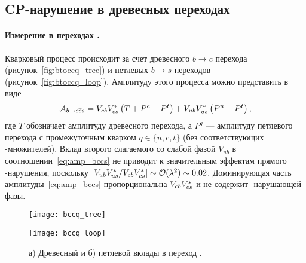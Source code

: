 \subsection{CP-нарушение в древесных переходах}\label{sec:cpv_tree}
\paragraph{\boldmath Измерение \sindbeta в переходах \btoccs. } Кварковый процесс \btoccs происходит за счет древесного $b\to c$ перехода (рисунок~\ref{fig:btoccq_tree}) и петлевых $b\to s$ переходов (рисунок~\ref{fig:btoccq_loop}).  Амплитуду этого процесса можно представить в виде~\cite{bfacphys}
\begin{equation}\label{eq:amp_bccs}
 \mathcal{A}_{b\to c\overline{c}s} = V_{cb}V_{cs}^*\left(T + P^c - P^t\right) + V_{ub}V_{us}^*\left(P^u - P^t\right),
\end{equation}
где $T$ обозначает амплитуду древесного перехода, а $P^q$ --- амплитуду петлевого перехода с промежуточным кварком $q\in\{u, c, t\}$ (без соответствующих \ckm-множителей).  Вклад второго слагаемого со слабой фазой $V_{ub}$ в соотношении~\eqref{eq:amp_bccs} не приводит к значительным эффектам прямого \cpconj-нарушения, поскольку $|V_{ub}V_{us}^*/V_{cb}V_{cs}^*|\sim\mathcal{O}(\lambda^2)\sim 0.02$.  Доминирующая часть амплитуды~\eqref{eq:amp_bccs} пропорциональна $V_{cb}V_{cs}^*$ и не содержит \cpconj-нарушающей фазы. 

\begin{figure}[htb]
\begin{minipage}[b]{0.5\textwidth}
 \centering
 \texttt{[image: bccq\_tree]}
 \subcaption{}
 \label{fig:btoccq_tree}
\end{minipage}
\begin{minipage}[b]{0.5\textwidth}
 \centering
 \texttt{[image: bccq\_loop]}
 \subcaption{}
 \label{fig:btoccq_loop}
\end{minipage}
 \caption{а) Древесный и б) петлевой вклады в переход \btoccq.}
 \label{fig:btoccq}
\end{figure}

